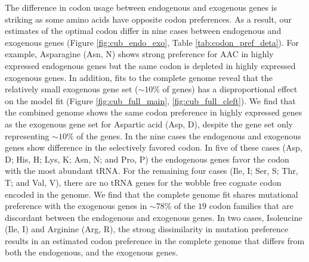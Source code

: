 \documentclass[fleqn,letterpaper]{article}
\begin{document}
The difference in codon usage between endogenous and exogenous genes is striking as some amino acids have opposite codon preferences. 
As a result, our estimates of the optimal codon differ in nine cases between endogenous and exogenous genes (Figure \ref{fig:cub_endo_exo}, Table \ref{tab:codon_pref_deta}).
For example, Asparagine (Asn, N) shows strong preference for AAC in highly expressed endogenous genes but the same codon is depleted in highly expressed exogenous genes.
In addition, fits to the complete \kluyveri genome reveal that the relatively small exogenous gene set ($\sim 10\%$ of genes) has a disproportional effect on the model fit (Figure \ref{fig:cub_full_main}, \ref{fig:cub_full_cleft}).
We find that the combined genome shows the same codon preference in highly expressed genes as the exogenous gene set for Aspartic acid (Asp, D), despite the gene set only representing $\sim 10 \%$ of the genes.
In the nine cases the endogenous and exogenous genes show difference in the selectively favored codon.
In five of these cases (Asp, D; His, H; Lys, K; Asn, N; and Pro, P) the endogenous genes favor the codon with the most abundant tRNA.
For the remaining four cases (Ile, I; Ser, S; Thr, T; and Val, V), there are no tRNA genes for the wobble free cognate codon encoded in the \kluyveri genome.
We find that the complete \kluyveri genome fit shares mutational preference with the exogenous genes in $\sim78\%$ of the $19$ codon families that are discordant between the endogenous and exogenous genes.
In two cases, Isoleucine (Ile, I) and Arginine (Arg, R), the strong dissimilarity in mutation preference results in an estimated codon preference in the complete \kluyveri genome that differs from both the endogenous, and the exogenous genes.

\end{document}
